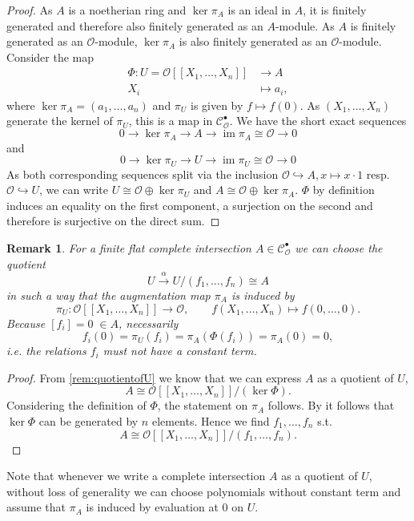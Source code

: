 \documentclass{article}
\theoremstyle{plain}%
\newtheorem{remark}[theorem]{Remark}
\theoremstyle{definition}
\theoremstyle{remark}
\newcommand{\cob}{\mathcal{C}_\mathcal{O}^\bullet}
\newcommand{\im}{\operatorname{im}}
\begin{document}
\begin{proof}
    As \(A\) is a noetherian ring and \(\ker \pi_A\) is an ideal in \(A\), it is finitely generated 
    and therefore also finitely generated as an \(A\)-module.
    As \(A\) is finitely generated as an \(\mathcal{O}\)-module, \(\ker \pi_A\) is also
    finitely generated as an \(\mathcal{O}\)-module. Consider the map
    \begin{align*}
        \Phi\colon U = \mathcal{O}[[X_1, \dots, X_n]] &\to A\\
        X_i &\mapsto a_i,
    \end{align*}
    where \(\ker \pi_A = (a_1, \dots, a_n)\) and \(\pi_U\) is given by \(f \mapsto f(0)\). 
    As \((X_1, \dots, X_n)\) generate the kernel of \(\pi_U\), this is a map in \(\cob\).
    We have the short exact sequences
    \[
        0 \to \ker \pi_A \to A \to \im \pi_A \cong \mathcal{O} \to 0
    \]
    and
    \[
        0 \to \ker \pi_U \to U \to \im \pi_U \cong \mathcal{O} \to 0
    \]
    As both corresponding sequences split via the inclusion \(\mathcal{O} \hookrightarrow A, x \mapsto x \cdot 1\)
    resp. \(\mathcal{O} \hookrightarrow U\), we can write \(U \cong \mathcal{O} \oplus \ker \pi_U\) and
    \(A \cong \mathcal{O} \oplus \ker \pi_A\).
    \(\Phi\) by definition induces an equality on the first component, 
    a surjection on the second and therefore is surjective on the direct sum.
\end{proof}

\begin{remark}\label{rem:noconstant}
    For a finite flat complete intersection \(A \in \cob\) we can choose the quotient
    \[
        U \xrightarrow{\alpha} U/(f_1, \dots, f_n) \cong A  
    \]
    in such a way that the augmentation map \(\pi_A\) is induced by 
    \[
        \pi_U\colon \mathcal{O}[[X_1, \dots, X_n]] \to \mathcal{O},\qquad f(X_1, \dots, X_n) \mapsto f(0,\dots, 0).  
    \]
    Because \([f_i] = 0 \; \in A\), necessarily
    \[
        f_i(0) = \pi_U(f_i) = \pi_A(\Phi(f_i)) = \pi_A(0) = 0,  
    \]
    i.e. the relations \(f_i\) must not have a constant term.
\end{remark}
\begin{proof}
    From \cref{rem:quotientofU} we know that we can express \(A\) as a quotient of \(U\),
    \[
        A \cong \mathcal{O}[[X_1, \dots, X_n]]/(\ker \Phi).
    \]
    Considering the definition of \(\Phi\), the statement on \(\pi_A\) follows.
    By \cite[theorem 21.2]{Matsumura1986} it follows that \(\ker \Phi\) can be generated by \(n\) elements.
    Hence we find \(f_1, \dots, f_n\) s.t.
    \[
        A \cong \mathcal{O}[[X_1, \dots, X_n]]/(f_1, \dots, f_n).
    \]
\end{proof}
Note that whenever we write a complete intersection \(A\) as a quotient of \(U\), without loss of generality
we can choose polynomials without constant term and assume that \(\pi_A\) is induced by evaluation at 0 on \(U\).
\end{document}

